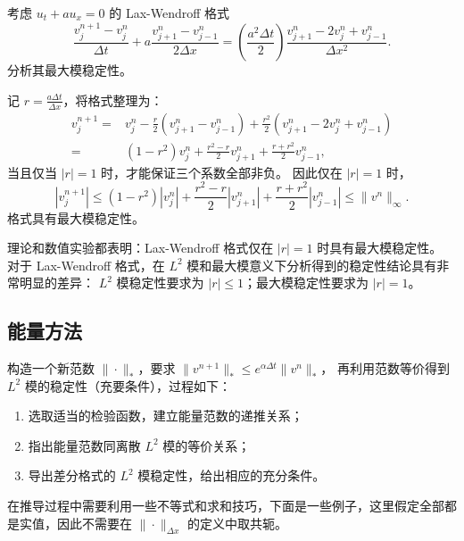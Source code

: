 \begin{example}
    考虑 $u_t + a u_{x} = 0$ 的 Lax-Wendroff 格式
    \[
        \frac{v_j^{n+1}-v_j^n}{\Delta t} + a \frac{v_{j+1}^n-v_{j-1}^n}{2\Delta x} = \left(\frac{a^2 \Delta t}{2}\right) \frac{v_{j+1}^n-2 v_j^n+v_{j-1}^n}{\Delta x^2}.
    \]
    分析其最大模稳定性。
\end{example}

\begin{solution*}
    记 $r = \frac{a \Delta t}{\Delta x}$，将格式整理为：
    \begin{align*}
        v_{j}^{n+1}
        ={} & v_j^n - \frac{r}2(v_{j+1}^n- v_{j-1}^n) + \frac{r^2}2
        (v_{j+1}^n-2v_{j}^n+v_{j-1}^n)                                          \\
        ={} & (1-r^2) v_j^n + \frac{r^2-r}2 v_{j+1}^n + \frac{r+r^2}2 v_{j-1}^n,
    \end{align*}
    当且仅当 $|r|=1$ 时，才能保证三个系数全部非负。
    因此仅在 $|r| = 1$ 时，
    \[
        |v_{j}^{n+1}| \le{} (1-r^2) |v_j^n| + \frac{r^2-r}2 |v_{j+1}^n| + \frac{r+r^2}2 |v_{j-1}^n| \le \|v^n\|_\infty.
    \]
    格式具有最大模稳定性。
\end{solution*}

\begin{remark}
    理论和数值实验都表明：Lax-Wendroff 格式仅在 $|r|=1$ 时具有最大模稳定性。
    对于 Lax-Wendroff 格式，在 $L^2$ 模和最大模意义下分析得到的稳定性结论具有非常明显的差异：
    $L^2$ 模稳定性要求为 $|r| \le 1$；最大模稳定性要求为 $|r|=1$。
\end{remark}


\subsection{能量方法}

构造一个新范数 $\|\cdot\|_*$，要求 $\| v^{n+1}\|_* \le e^{\alpha \Delta t} \| v^{n}\|_*$，
再利用范数等价得到 $L^2$ 模的稳定性（充要条件），过程如下：
\begin{enumerate}
    \item 选取适当的检验函数，建立能量范数的递推关系；
    \item 指出能量范数同离散 $L^2$ 模的等价关系；
    \item 导出差分格式的 $L^2$ 模稳定性，给出相应的充分条件。
\end{enumerate}
在推导过程中需要利用一些不等式和求和技巧，下面是一些例子，这里假定全部都是实值，因此不需要在 $\|\cdot\|_{\Delta x}$ 的定义中取共轭。


